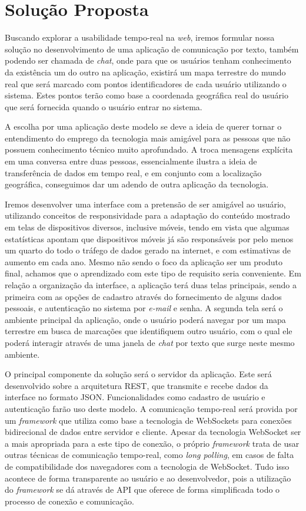 \section{Solução Proposta}
Buscando explorar a usabilidade tempo-real na \textit{web}, iremos formular nossa solução no desenvolvimento de uma aplicação de comunicação por texto, também podendo ser chamada de \textit{chat}, onde para que os usuários tenham conhecimento da existência um do outro na aplicação, existirá um mapa terrestre do mundo real que será marcado com pontos identificadores de cada usuário utilizando o sistema. Estes pontos terão como base a coordenada geográfica real do usuário que será fornecida quando o usuário entrar no sistema.

A escolha por uma aplicação deste modelo se deve a ideia de querer tornar o entendimento do emprego da tecnologia mais amigável para as pessoas que não possuem conhecimento técnico muito aprofundado. A troca mensagens explícita em uma conversa entre duas pessoas, essencialmente ilustra a ideia de transferência de dados em tempo real, e em conjunto com a localização geográfica, conseguimos dar um adendo de outra aplicação da tecnologia.

Iremos desenvolver uma interface com a pretensão de ser amigável ao usuário, utilizando conceitos de responsividade para a adaptação do conteúdo mostrado em telas de dispositivos diversos, inclusive móveis, tendo em vista que algumas estatísticas \cite{internet-traffic-stats1} apontam que dispositivos móveis já são responsáveis por pelo menos um quarto do todo o tráfego de dados gerado na internet, e com estimativas \cite{internet-traffic-stats2} \cite{internet-traffic-stats3} de aumento em cada ano. Mesmo não sendo o foco da aplicação ser um produto final, achamos que o aprendizado com este tipo de requisito seria conveniente. Em relação a organização da interface, a aplicação terá duas telas principais, sendo a primeira com as opções de cadastro através do fornecimento de alguns dados pessoais, e autenticação no sistema por \textit{e-mail} e senha. A segunda tela será o ambiente principal da aplicação, onde o usuário poderá navegar por um mapa terrestre em busca de marcações que identifiquem outro usuário, com o qual ele poderá interagir através de uma janela de \textit{chat} por texto que surge neste mesmo ambiente.

O principal componente da solução será o servidor da aplicação. Este será desenvolvido sobre a arquitetura REST, que transmite e recebe dados da interface no formato JSON. Funcionalidades como cadastro de usuário e autenticação farão uso deste modelo. A comunicação tempo-real será provida por um \textit{framework} que utiliza como base a tecnologia de WebSockets para conexões bidirecional de dados entre servidor e cliente. Apesar da tecnologia WebSocket ser a mais apropriada para a este tipo de conexão, o próprio \textit{framework} trata de usar outras técnicas de comunicação tempo-real, como \textit{long polling}, em casos de falta de compatibilidade dos navegadores com a tecnologia de WebSocket. Tudo isso acontece de forma transparente ao usuário e ao desenvolvedor, pois a utilização do \textit{framework} se dá através de API que oferece de forma simplificada todo o processo de conexão e comunicação.


